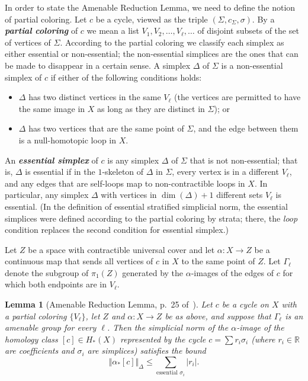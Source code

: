\documentclass[psamsfonts]{amsart}
\newtheorem{lemma}[theorem]{Lemma}
\theoremstyle{remark}
\newcommand{\abs}[1]{\left\lvert #1 \right\rvert}
\begin{document}
In order to state the Amenable Reduction Lemma, we need to define the notion of partial coloring.  Let $c$ be a cycle, viewed as the triple $(\Sigma, c_{\Sigma}, \sigma)$.  By a \textbf{\emph{partial coloring}} of $c$ we mean a list $V_1, V_2, \ldots, V_\ell, \ldots$ of disjoint subsets of the set of vertices of $\Sigma$.   According to the partial coloring we classify each simplex as either essential or non-essential; the non-essential simplices are the ones that can be made to disappear in a certain sense.  A simplex $\Delta$ of $\Sigma$ is a non-essential simplex of $c$ if either of the following conditions holds:
\begin{itemize}
\item $\Delta$ has two distinct vertices in the same $V_\ell$ (the vertices are permitted to have the same image in $X$ as long as they are distinct in $\Sigma$); or
\item $\Delta$ has two vertices that are the same point of $\Sigma$, and the edge between them is a null-homotopic loop in $X$.
\end{itemize}
An \textbf{\emph{essential simplex}} of $c$ is any simplex $\Delta$ of $\Sigma$ that is not non-essential; that is, $\Delta$ is essential if in the $1$-skeleton of $\Delta$ in $\Sigma$, every vertex is in a different $V_\ell$, and any edges that are self-loops map to non-contractible loops in $X$.  In particular, any simplex $\Delta$ with vertices in $\dim(\Delta) + 1$ different sets $V_\ell$ is essential.  (In the definition of essential stratified simplicial norm, the essential simplices were defined according to the partial coloring by strata; there, the \emph{loop} condition replaces the second condition for essential simplex.)  

Let $Z$ be a space with contractible universal cover and let $\alpha : X \rightarrow Z$ be a continuous map that sends all vertices of $c$ in $X$ to the same point of $Z$.  Let $\Gamma_\ell$ denote the subgroup of $\pi_1(Z)$ generated by the $\alpha$-images of the edges of $c$ for which both endpoints are in $V_\ell$.

\begin{lemma}[Amenable Reduction Lemma, p.~25 of~\cite{Gromov09}]\label{amen-red}
Let $c$ be a cycle on $X$ with a partial coloring $\{V_\ell\}$, let $Z$ and $\alpha : X \rightarrow Z$ be as above, and suppose that $\Gamma_\ell$ is an amenable group for every $\ell$.  Then the simplicial norm of the $\alpha$-image of the homology class $[c] \in H_*(X)$ represented by the cycle $c = \sum r_i \sigma_i$ (where $r_i \in \mathbb{R}$ are coefficients and $\sigma_i$ are simplices) satisfies the bound
\[\Vert \alpha_*[c]\Vert_{\Delta} \leq \sum_{\text{essential }\sigma_i} \abs{r_i}.\]
\end{lemma}
\end{document}
